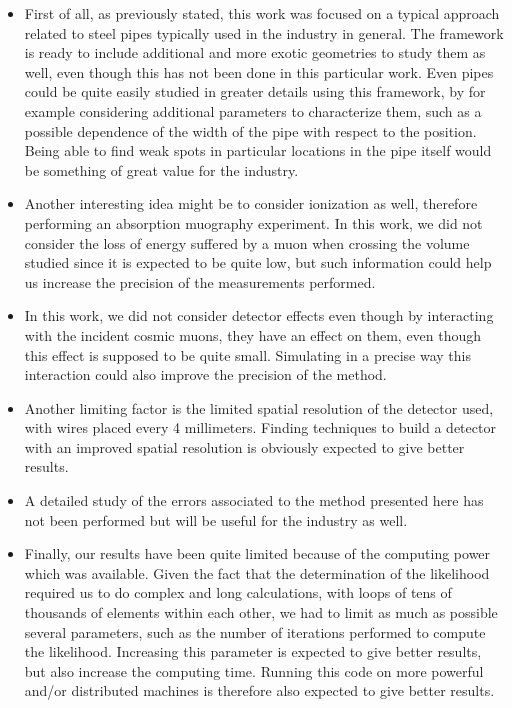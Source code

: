 \documentclass[a4paper, 11pt]{report}
\begin{document}
\begin{itemize}
    \item First of all, as previously stated, this work was focused on a typical approach related to steel pipes typically used in the industry in general. The framework is ready to include additional and more exotic geometries to study them as well, even though this has not been done in this particular work. Even pipes could be quite easily studied in greater details using this framework, by for example considering additional parameters to characterize them, such as a possible dependence of the width of the pipe with respect to the position. Being able to find weak spots in particular locations in the pipe itself would be something of great value for the industry.
    \item Another interesting idea might be to consider ionization as well, therefore performing an absorption muography experiment. In this work, we did not consider the loss of energy suffered by a muon when crossing the volume studied since it is expected to be quite low, but such information could help us increase the precision of the measurements performed.
    \item In this work, we did not consider detector effects even though by interacting with the incident cosmic muons, they have an effect on them, even though this effect is supposed to be quite small. Simulating in a precise way this interaction could also improve the precision of the method.
    \item Another limiting factor is the limited spatial resolution of the detector used, with wires placed every 4 millimeters. Finding techniques to build a detector with an improved spatial resolution is obviously expected to give better results.
    \item A detailed study of the errors associated to the method presented here has not been performed but will be useful for the industry as well.
    \item Finally, our results have been quite limited because of the computing power which was available. Given the fact that the determination of the likelihood required us to do complex and long calculations, with loops of tens of thousands of elements within each other, we had to limit as much as possible several parameters, such as the number of iterations performed to compute the likelihood. Increasing this parameter is expected to give better results, but also increase the computing time. Running this code on more powerful and/or distributed machines is therefore also expected to give better results.
\end{itemize}
\end{document}
